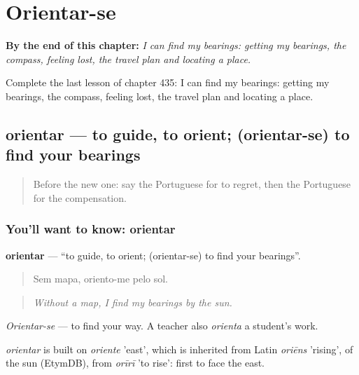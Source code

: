 
\chapter{Orientar-se}
\label{ch:pt-orientar-se}

\begin{chapteropening}
\textbf{By the end of this chapter:} \emph{I can find my bearings: getting my bearings, the compass, feeling lost, the travel plan and locating a place.}

Complete the last lesson of chapter 435: I can find my bearings: getting my bearings, the compass, feeling lost, the travel plan and locating a place.
\end{chapteropening}

\section[orientar]{orientar — to guide, to orient; (orientar-se) to find your bearings}

\label{lesson:PT-C435-orientar}



\begin{quote}
Before the new one: say the Portuguese for to regret, then the Portuguese for the compensation.
\end{quote}

\subsection*{You'll want to know: orientar}
\textbf{orientar} — \textquotedblleft{}to guide, to orient; (orientar-se) to find your bearings\textquotedblright{}.

\begin{quote}
Sem mapa, oriento-me pelo sol.
\end{quote}

\begin{quote}
\emph{Without a map, I find my bearings by the sun.}
\end{quote}

\emph{Orientar-se} — to find your way. A teacher also \emph{orienta} a student's work.

\begin{cousinweb}
\emph{orientar} is built on \emph{oriente} 'east', which is inherited from Latin \emph{oriēns} 'rising', of the sun (EtymDB), from \emph{orīrī} 'to rise': first to face the east.
\end{cousinweb}

